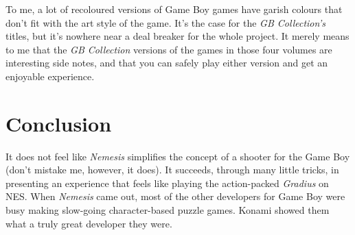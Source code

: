 \documentclass{book}
\begin{document}
\FloatBarrier\vspace{\baselineskip}\centering
\begin{minipage}{0.45\linewidth}\end{minipage}\vspace{2pt}
\begin{minipage}{0.45\linewidth}\end{minipage}
\par\justifying
To me, a lot of recoloured versions of Game Boy games have garish colours that don’t fit with the art style of the game. It’s the case for the \emph{GB Collection’s} titles, but it’s nowhere near a deal breaker for the whole project. It merely means to me that the \emph{GB Collection} versions of the games in those four volumes are interesting side notes, and that you can safely play either version and get an enjoyable experience.\par
\FloatBarrier\section*{Conclusion}
It does not feel like \emph{Nemesis} simplifies the concept of a shooter for the Game Boy (don’t mistake me, however, it does). It succeeds, through many little tricks, in presenting an experience that feels like playing the action-packed \emph{Gradius} on NES. When \emph{Nemesis} came out, most of the other developers for Game Boy were busy making slow-going character-based puzzle games. Konami showed them what a truly great developer they were.\par
\FloatBarrier\vspace{\baselineskip}\centering
\begin{minipage}{0.45\linewidth}\end{minipage}\vspace{2pt}
\begin{minipage}{0.45\linewidth}\end{minipage}
\par\justifying
\end{document}
